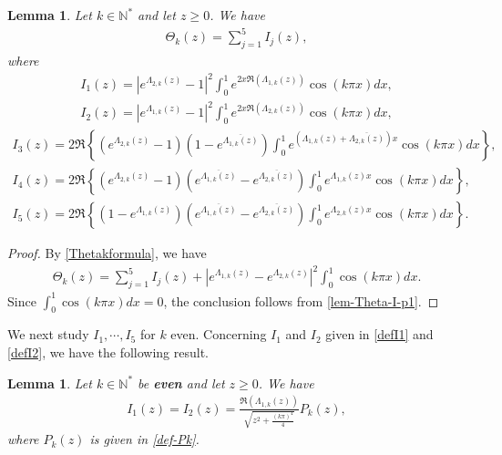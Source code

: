 \documentclass[11pt, reqno]{amsart}
\theoremstyle{plain}
\newtheorem{lemma}[thm]{Lemma}
\numberwithin{equation}{section}
\newcommand{\mN}{\mathbb{N}}
\begin{document}
\begin{lemma} \label{lem-Theta-I} Let $k \in \mN^*$  and let $z \ge 0$.  We have 
\begin{align}	\label{Thetak=sum}
   \Theta_k(z) = \sum_{j = 1}^5 I_j(z),
    \end{align} where  
 \begin{align}	\label{defI1}
   I_1(z) = \left|e^{\Lambda_{2,k}(z)} - 1 \right|^2 \int_0^1 e^{2x\Re (\Lambda_{1,k}(z))} \cos(k \pi x) dx, 
 \end{align}
 \begin{align}	\label{defI2}
        I_2(z) = \left|e^{\Lambda_{1,k}(z)} - 1 \right|^2 \int_{0}^1 e^{2x\Re (\Lambda_{2,k}(z))} \cos(k \pi x) dx, 
 \end{align}
 \begin{align}	\label{defI3}
        I_3(z) = 2\Re \left\{ \left(e^{\Lambda_{2,k}(z)} - 1 \right) \left(1 - e^{\overline{\Lambda_{1,k}(z)}} \right) \int_0^1  e^{\left(\Lambda_{1,k}(z) + \overline{\Lambda_{2,k}(z)} \right)x} \cos(k \pi x) dx \right\},
\end{align}
 \begin{align}    \label{defI4}
 I_4(z) = 2\Re \left\{ \left(e^{\Lambda_{2,k}(z)} - 1 \right)  \left(e^{\overline{\Lambda_{1,k}(z)}} - e^{\overline{\Lambda_{2,k}(z)}} \right) \int_0^1 e^{\Lambda_{1,k}(z) x} \cos(k \pi x) dx \right\},  
\end{align}
\begin{align}	\label{defI5}
        I_5(z) = 2\Re \left\{  \left(1 - e^{\Lambda_{1,k}(z)} \right) \left(e^{\overline{\Lambda_{1,k}(z)}} - e^{\overline{\Lambda_{2,k}(z)}} \right) \int_0^1 e^{\Lambda_{2,k}(z) x} \cos(k \pi x) dx \right\}. 
\end{align}
\end{lemma}

\begin{proof} 
By \eqref{Thetakformula}, we have
\begin{align} \label{lem-Theta-I-p1}
   \Theta_k(z) = \sum_{j = 1}^5 I_j(z) + \left|e^{\Lambda_{1,k}(z)} - e^{\Lambda_{2,k}(z)} \right|^2 \int_0^1 \cos(k \pi x) dx. 
    \end{align} 
    Since $\int_0^1 \cos(k \pi x) dx = 0$, the conclusion follows from \eqref{lem-Theta-I-p1}. 
\end{proof}

We next study $I_1, \cdots, I_5$ for $k$ even. Concerning $I_1$ and $I_2$ given in \eqref{defI1} and \eqref{defI2}, we have the following result. 

\begin{lemma} \label{lem-I1I2} Let $k \in \mN^*$ be {\bf even} and let $z \ge 0$. We have 
\begin{align}    \label{I2=I1} 
        I_1 (z) = I_2(z) = \frac{\Re(\Lambda_{1,k}(z))}{\sqrt{z^2 + \frac{(k \pi)^4}{4}}}  P_k(z), 
   \end{align}
where $P_k(z)$ is given in \eqref{def-Pk}.
\end{lemma}
\end{document}
